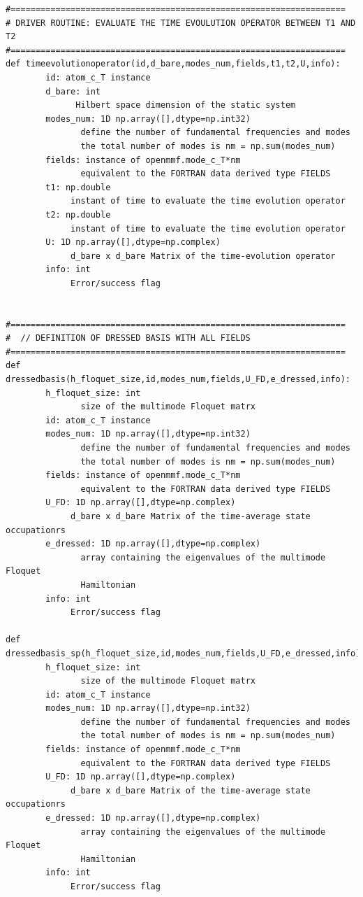 \documentclass[10pt,a4paper]{article}
\begin{document}
\begin{verbatim}
#===================================================================
# DRIVER ROUTINE: EVALUATE THE TIME EVOULUTION OPERATOR BETWEEN T1 AND T2
#===================================================================
def timeevolutionoperator(id,d_bare,modes_num,fields,t1,t2,U,info):
        id: atom_c_T instance
        d_bare: int
              Hilbert space dimension of the static system
        modes_num: 1D np.array([],dtype=np.int32)
               define the number of fundamental frequencies and modes
               the total number of modes is nm = np.sum(modes_num)
        fields: instance of openmmf.mode_c_T*nm 
               equivalent to the FORTRAN data derived type FIELDS
        t1: np.double
             instant of time to evaluate the time evolution operator
        t2: np.double
             instant of time to evaluate the time evolution operator
        U: 1D np.array([],dtype=np.complex)
             d_bare x d_bare Matrix of the time-evolution operator
        info: int
             Error/success flag


#===================================================================
#  // DEFINITION OF DRESSED BASIS WITH ALL FIELDS
#===================================================================
def dressedbasis(h_floquet_size,id,modes_num,fields,U_FD,e_dressed,info):
        h_floquet_size: int
               size of the multimode Floquet matrx
        id: atom_c_T instance
        modes_num: 1D np.array([],dtype=np.int32)
               define the number of fundamental frequencies and modes
               the total number of modes is nm = np.sum(modes_num)
        fields: instance of openmmf.mode_c_T*nm 
               equivalent to the FORTRAN data derived type FIELDS
        U_FD: 1D np.array([],dtype=np.complex)
             d_bare x d_bare Matrix of the time-average state occupationrs                          
        e_dressed: 1D np.array([],dtype=np.complex)
               array containing the eigenvalues of the multimode Floquet
               Hamiltonian
        info: int
             Error/success flag

def dressedbasis_sp(h_floquet_size,id,modes_num,fields,U_FD,e_dressed,info):
        h_floquet_size: int
               size of the multimode Floquet matrx
        id: atom_c_T instance
        modes_num: 1D np.array([],dtype=np.int32)
               define the number of fundamental frequencies and modes
               the total number of modes is nm = np.sum(modes_num)
        fields: instance of openmmf.mode_c_T*nm 
               equivalent to the FORTRAN data derived type FIELDS
        U_FD: 1D np.array([],dtype=np.complex)
             d_bare x d_bare Matrix of the time-average state occupationrs                          
        e_dressed: 1D np.array([],dtype=np.complex)
               array containing the eigenvalues of the multimode Floquet
               Hamiltonian
        info: int
             Error/success flag



\end{verbatim}
\end{document}
